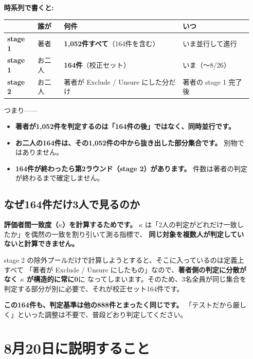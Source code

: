 \documentclass[a4paper]{ltjsarticle}
\newcommand{\notebox}[1]{%
  \par\medskip
  \noindent\colorbox{warn}{%
    \begin{minipage}{\dimexpr\linewidth-2\fboxsep\relax}
      \vspace{4pt}#1\vspace{4pt}
    \end{minipage}}%
  \par\medskip}
\begin{document}
\medskip
\noindent
\textbf{時系列で書くと:}

\begin{center}
\begin{tabularx}{\linewidth}{L{5.5em} L{5em} X L{9em}}
\toprule
 & 誰が & 何件 & いつ \\
\midrule
\textbf{stage 1} & 著者 & \textbf{1,052件すべて}（164件を含む） & いま並行して進行 \\
\textbf{stage 1} & お二人 & \textbf{164件}（校正セット） & いま（〜8/26） \\
\textbf{stage 2} & お二人 & 著者が Exclude / Unsure にした分だけ & 著者の stage 1 完了後 \\
\bottomrule
\end{tabularx}
\end{center}

\noindent
つまり——

\begin{itemize}
  \item \textbf{著者が1,052件を判定するのは「164件の後」ではなく、同時並行です。}
  \item \textbf{お二人の164件は、その1,052件の中から抜き出した部分集合です。} 別物ではありません。
  \item \textbf{164件が終わったら第2ラウンド（stage 2）があります。} 件数は著者の判定が終わるまで確定しません。
\end{itemize}

\subsection*{なぜ164件だけ3人で見るのか}

\textbf{評価者間一致度（$\kappa$）を計算するためです。}
$\kappa$ は「2人の判定がどれだけ一致したか」を偶然の一致を割り引いて測る指標で、
\textbf{同じ対象を複数人が判定していないと計算できません。}

\medskip
\noindent
stage 2 の除外プールだけで計算しようとすると、そこに入っているのは定義上すべて
「著者が Exclude / Unsure にしたもの」なので、\textbf{著者側の判定に分散がなく $\kappa$ が構造的に常に0}に
なってしまいます。そのため、3名全員が同じ集合を判定する部分が別に必要で、それが校正セット164件です。

\notebox{\textbf{この164件も、判定基準は他の888件とまったく同じです。}
「テストだから厳しく」といった調整は不要で、普段どおり判定してください。}

\section{8月20日に説明すること}
\end{document}
